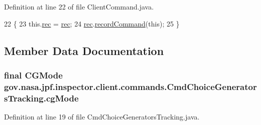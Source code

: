 Definition at line 22 of file Client\+Command.\+java.


\begin{DoxyCode}
22                                                   \{
23     this.\hyperlink{classgov_1_1nasa_1_1jpf_1_1inspector_1_1client_1_1_client_command_af4246f2427035c72a6af45a2c61361f7}{rec} = \hyperlink{classgov_1_1nasa_1_1jpf_1_1inspector_1_1client_1_1_client_command_af4246f2427035c72a6af45a2c61361f7}{rec};
24     \hyperlink{classgov_1_1nasa_1_1jpf_1_1inspector_1_1client_1_1_client_command_af4246f2427035c72a6af45a2c61361f7}{rec}.\hyperlink{classgov_1_1nasa_1_1jpf_1_1inspector_1_1client_1_1_command_recorder_af5f212124179773e46c8b45f1d01a32d}{recordCommand}(\textcolor{keyword}{this});
25   \}
\end{DoxyCode}


\subsection{Member Data Documentation}
\subsubsection[{\texorpdfstring{cg\+Mode}{cgMode}}]{\setlength{\rightskip}{0pt plus 5cm}final {\bf C\+G\+Mode} gov.\+nasa.\+jpf.\+inspector.\+client.\+commands.\+Cmd\+Choice\+Generators\+Tracking.\+cg\+Mode\hspace{0.3cm}{\ttfamily [private]}}\hypertarget{classgov_1_1nasa_1_1jpf_1_1inspector_1_1client_1_1commands_1_1_cmd_choice_generators_tracking_ab6410ab4d33fab56087f59dbd898824b}{}\label{classgov_1_1nasa_1_1jpf_1_1inspector_1_1client_1_1commands_1_1_cmd_choice_generators_tracking_ab6410ab4d33fab56087f59dbd898824b}


Definition at line 19 of file Cmd\+Choice\+Generators\+Tracking.\+java.

